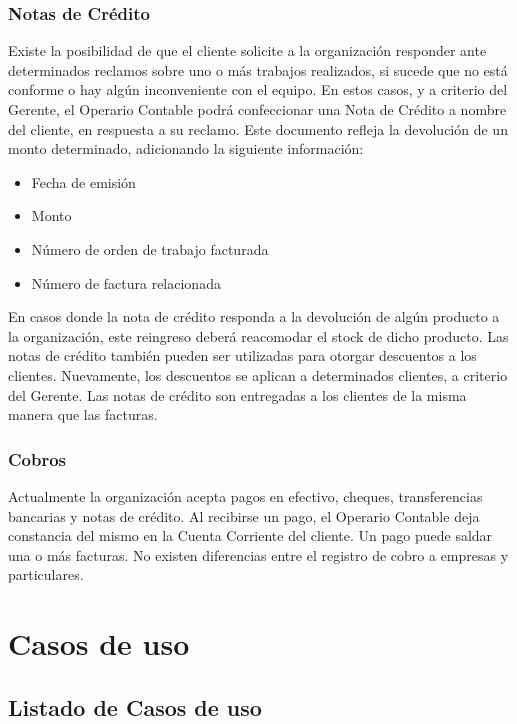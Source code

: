 \documentclass[12pt]{extarticle}
\begin{document}
\begin{spacing}{1.2}
    \subsubsection*{Notas de Crédito}
    Existe la posibilidad de que el cliente solicite a la organización responder ante determinados reclamos sobre uno o más trabajos realizados, si sucede que no está conforme o hay algún inconveniente con el equipo. En estos casos, y a criterio del Gerente, el Operario Contable podrá confeccionar una Nota de Crédito a nombre del cliente, en respuesta a su reclamo. Este documento refleja la devolución de un monto determinado, adicionando la siguiente información: \\
    \begin{itemize}
        \item Fecha de emisión
        \item Monto
        \item Número de orden de trabajo facturada
        \item Número de factura relacionada
    \end{itemize}

	En casos donde la nota de crédito responda a la devolución de algún producto a la organización, este reingreso deberá reacomodar el stock de dicho producto.
	Las notas de crédito también pueden ser utilizadas para otorgar descuentos a los clientes. Nuevamente, los descuentos se aplican a determinados clientes, a criterio del Gerente.
	Las notas de crédito son entregadas a los clientes de la misma manera que las facturas.\\
	
	\subsubsection{Cobros}
     Actualmente la organización acepta pagos en efectivo, cheques, transferencias bancarias y notas de crédito. Al recibirse un pago, el Operario Contable deja constancia del mismo en la Cuenta Corriente del cliente. Un pago puede saldar una o más facturas. No existen diferencias entre el registro de cobro a empresas y particulares.\\



    \clearpage
    \section{Casos de uso}
    \subsection{Listado de Casos de uso}
    \begin{multicols}{2}
    \begin{enumerate}	

\end{enumerate}
\end{multicols}
\end{spacing}
\end{document}
